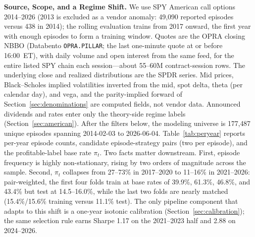 \documentclass[sigconf,review,anonymous]{acmart}
\begin{document}
\medskip\noindent\textbf{Source, Scope, and a Regime Shift.}
\label{sec:data-source}
We use SPY American call options 2014--2026 (2013 is excluded as a vendor anomaly: 49{,}090 reported episodes versus 438 in 2014); the rolling evaluation trains from 2017 onward, the first year with enough episodes to form a training window. Quotes are the OPRA closing NBBO (Databento \texttt{OPRA.PILLAR}; the last one-minute quote at or before 16:00~ET), with daily volume and open interest from the same feed, for the entire listed SPY chain each session---about 55--60M contract-session rows. The underlying close and realized distributions are the SPDR series. Mid prices, Black--Scholes implied volatilities inverted from the mid, spot delta, theta (per calendar day), and vega, and the parity-implied forward of Section~\ref{sec:denominations} are computed fields, not vendor data. Announced dividends and rates enter only the theory-side regime labels (Section~\ref{sec:american}). After the filters below, the modeling universe is 177{,}487 unique episodes spanning 2014-02-03 to 2026-06-04. Table~\ref{tab:peryear} reports per-year episode counts, candidate episode-strategy pairs (two per episode), and the profitable-label base rate $\pi_t$. Two facts matter downstream. First, episode frequency is highly non-stationary, rising by two orders of magnitude across the sample. Second, $\pi_t$ collapses from 27--73\% in 2017--2020 to 11--16\% in 2021--2026: pair-weighted, the first four folds train at base rates of 39.9\%, 61.3\%, 46.8\%, and 43.4\% but test at 14.5--16.0\%, while the last two folds are nearly matched (15.4\%/15.6\% training versus 11.1\% test). The only pipeline component that adapts to this shift is a one-year isotonic calibration (Section~\ref{sec:calibration}); the same selection rule earns Sharpe 1.17 on the 2021--2023 half and 2.88 on 2024--2026.
\end{document}
